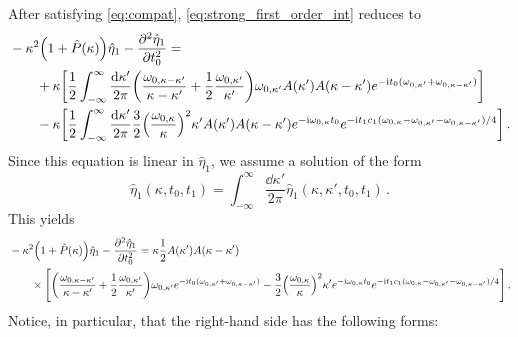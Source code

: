 \documentclass{jfm}
\newcommand{\GenPk}{\hat{P}(\kappa)}
\newcommand{\im}{\mathrm{i}}
\begin{document}
After satisfying \cref{eq:compat}, \cref{eq:strong_first_order_int} reduces to
\begin{equation}
  \begin{split}
  &-\kappa^2 \pqty{1 + \GenPk} \hat{\eta}_1 - \pdv[2]{\hat{\eta}_1}{t_0}
    = \\
    &\qquad
    + \kappa \bqty{\frac{1}{2} \int_{-\infty}^{\infty}
      \frac{\dd{\kappa'}}{2 \pi}
    \pqty{
      \frac{\omega_{0,\kappa-\kappa'}}{\kappa-\kappa'}
      + \frac{1}{2} \frac{\omega_{0,\kappa'}}{\kappa'}
    } \omega_{0,\kappa'} A(\kappa') A(\kappa-\kappa')
    e^{-\im t_0 (\omega_{0,\kappa'} + \omega_{0,\kappa-\kappa'})}} \\
    &\qquad
    -\kappa \bqty{\frac{1}{2} \int_{-\infty}^{\infty}
      \frac{\dd{\kappa'}}{2 \pi} \frac{3}{2}
      \pqty{\frac{\omega_{0,\kappa}}{\kappa}}^2 \kappa' A(\kappa')
      A(\kappa-\kappa') e^{-\im \omega_{0,\kappa} t_0}
      e^{-\im t_1 c_1 (\omega_{0,\kappa} - \omega_{0,\kappa'} -
      \omega_{0,\kappa-\kappa'})/4}
      } \,.
  \end{split}
\end{equation}
Since this equation is linear in $\hat{\eta}_1$, we assume a solution of
the form
\begin{equation}
  \hat{\eta}_1(\kappa,t_0,t_1) = \int_{-\infty}^{\infty}
  \frac{\dd{\kappa'}}{2 \pi} \hat{\eta}_1(\kappa,\kappa',t_0,t_1) \,.
  \label{eq:modal_decomp}
\end{equation}
This yields
\begin{equation}
  \begin{split}
  &-\kappa^2 \pqty{1 + \GenPk} \hat{\eta}_1 - \pdv[2]{\hat{\eta}_1}{t_0}
    =
    \kappa \frac{1}{2} A(\kappa') A(\kappa-\kappa')
    \\ &\qquad \times
    \Biggl[
    \pqty{
      \frac{\omega_{0,\kappa-\kappa'}}{\kappa-\kappa'}
      + \frac{1}{2} \frac{\omega_{0,\kappa'}}{\kappa'}
    } \omega_{0,\kappa'}
    e^{-\im t_0 (\omega_{0,\kappa'} + \omega_{0,\kappa-\kappa'})}
    - \frac{3}{2} \pqty{\frac{\omega_{0,\kappa}}{\kappa}}^2 \kappa'
    e^{-\im \omega_{0,\kappa} t_0}
    e^{-\im t_1 c_1 (\omega_{0,\kappa} - \omega_{0,\kappa'} -
    \omega_{0,\kappa-\kappa'})/4}
    \Biggr] \,.
  \end{split}
\end{equation}
Notice, in particular, that the right-hand side has the following forms:
\end{document}
